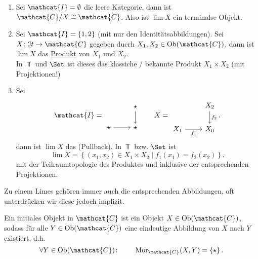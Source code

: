 \begin{example}
    \begin{enumerate}[1)]
        \item Sei $\mathcat{I} = \emptyset$ die leere Kategorie, dann ist $\mathcat{C} / X \cong \mathcat{C}$. Also ist $\lim X$ ein terminalse Objekt.
        \item Sei $\mathcat{I} = \left \{1,2\right\} $ (mit nur den Identitätsabbildungen). Sei $X\colon  \mathcal{I}t \to  \mathcat{C}$ gegeben ducrh $X_1,X_2\in \Ob(\mathcat{C})$, dann ist $\lim X$ das  \underline{Produkt} von $X_1$ und $X_2$. \\
            In $\Top$ und  $\Set$ ist dieses das klassiche / bekannte Produkt  $X_1\times X_2$ (mit Projektionen!)
        \item Sei 
            \[
            \mathcat{I} = 
            \begin{tikzcd}
                & \star \ar{d} \\
                \star \ar{r} & \star 
            \end{tikzcd}
            \qquad
            X = 
            \begin{tikzcd}
                & X_2 \ar{d}{f_2} \\
                X_1 \ar[swap]{r}{f_1} & X_0
            \end{tikzcd}
            .\] 
            dann ist $\lim X$ das   (Pullback). In $\Top$ bzw.  $\Set$ ist
             \[
                 \lim X = \left \{(x_1,x_2) \in  X_1\times X_2 \mid  f_1(x_1) = f_2(x_2)\right\} 
            .\] 
            mit der Teilraumtopologie des Produktes und inklusive der entsprechenden Projektionen.
    \end{enumerate}
\end{example}

\begin{oral}
    Zu einem Limes gehören immer auch die entsprechenden Abbildungen, oft unterdrücken wir diese jedoch implizit.
\end{oral}

\begin{definition}\label{def:initiales-objekt}
    Ein initiales Objekt in $\mathcat{C}$ ist ein Objekt $X\in \Ob(\mathcat{C})$, sodass für alle $Y\in \Ob(\mathcat{C})$ eine eindeutige Abbildung von $X$ nach  $Y$ existiert, d.h.
     \[
         \forall Y\in \Ob(\mathcat{C})\colon  \qquad \Mor_{\mathcat{C}}(X,Y) = \left \{\star\right\} 
    .\] 
\end{definition}

